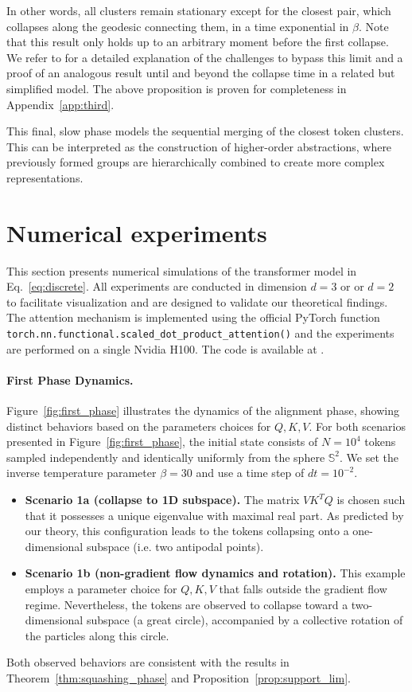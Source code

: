 \documentclass{article}
\numberwithin{theorem}{section}
\begin{document}
In other words, all clusters remain stationary except for the closest pair, which collapses along the geodesic connecting them, in a time exponential in $\beta$.  Note that this result only holds up to an arbitrary moment before the first collapse. We refer to \cite[Section 6]{geshkovski2024dynamic} for a detailed explanation of the challenges to bypass this limit and a proof of an analogous result until and beyond the collapse time in a related but simplified model. The above proposition is proven for completeness in Appendix~\ref{app:third}.

This final, slow phase models the sequential merging of the closest token clusters. This can be interpreted as the construction of higher-order abstractions, where previously formed groups are hierarchically combined to create more complex representations.

\section{Numerical experiments}
This section presents numerical simulations of the transformer model in Eq.~\eqref{eq:discrete}. All experiments are conducted in dimension $d=3$ or  or $d=2$ to facilitate visualization and are designed to validate our theoretical findings. The attention mechanism is implemented using the official PyTorch function \texttt{torch.nn.functional.scaled\_dot\_product\_attention()} and the experiments are performed on a single Nvidia H100.
The code is available at \cite{repo}.
\paragraph{First Phase Dynamics.}
Figure~\ref{fig:first_phase} illustrates the dynamics of the alignment phase, showing distinct behaviors based on the parameters choices for $Q, K, V$. For both scenarios presented in Figure~\ref{fig:first_phase}, the initial state consists of $N=10^4$ tokens sampled independently and identically uniformly from the sphere $\mathbb{S}^2$. We set the inverse temperature parameter $\beta=30$ and use a time step of $dt=10^{-2}$.
\begin{itemize}
    \item \textbf{Scenario 1a (collapse to 1D subspace).} The matrix $VK^TQ$ is chosen such that it possesses a unique eigenvalue with maximal real part. As predicted by our theory, this configuration leads to the tokens collapsing onto a one-dimensional subspace (i.e. two antipodal points). 
    \item \textbf{Scenario 1b (non-gradient flow dynamics and rotation).} This example employs a parameter choice for $Q, K, V$ that falls outside the gradient flow regime. Nevertheless, the tokens are observed to collapse toward a two-dimensional subspace (a great circle), accompanied by a collective rotation of the particles along this circle.
\end{itemize}
Both observed behaviors are consistent with the results in Theorem~\ref{thm:squashing_phase}  and Proposition~\ref{prop:support_lim}.
\end{document}
